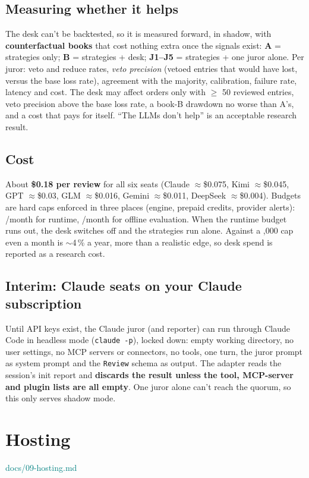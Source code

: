 \documentclass[11pt,a4paper]{article}
\newcommand\euro{\ifmmode\text{\texteuro}\else\texteuro\fi}
\newcommand\Section[1]{\Needspace{14\baselineskip}\section{#1}}
\newcommand\code[1]{\texttt{#1}}
\newcommand\doc[1]{\textsf{\footnotesize\textcolor{teal}{#1}}}
\begin{document}
\subsection{Measuring whether it helps}
The desk can't be backtested, so it is measured forward, in shadow, with \textbf{counterfactual books} that cost nothing extra
once the signals exist: \textbf{A} = strategies only; \textbf{B} = strategies + desk; \textbf{J1--J5} = strategies + one juror
alone. Per juror: veto and reduce rates, \emph{veto precision} (vetoed entries that would have lost, versus the base loss rate),
agreement with the majority, calibration, failure rate, latency and cost. The desk may affect orders only with $\ge$ 50 reviewed
entries, veto precision above the base loss rate, a book-B drawdown no worse than A's, and a cost that pays for itself.
``The LLMs don't help'' is an acceptable research result.

\subsection{Cost}
About \textbf{\$0.18 per review} for all six seats (Claude $\approx$\$0.075, Kimi $\approx$\$0.045, GPT $\approx$\$0.03, GLM
$\approx$\$0.016, Gemini $\approx$\$0.011, DeepSeek $\approx$\$0.004). Budgets are hard caps enforced in three places (engine,
prepaid credits, provider alerts): \euro10/month for runtime, \euro15/month for offline evaluation. When the runtime budget runs
out, the desk switches off and the strategies run alone. Against a \euro1,000 cap even \euro3 a month is $\sim$4\,\% a year, more
than a realistic edge, so desk spend is reported as a research cost.

\subsection{Interim: Claude seats on your Claude subscription}
Until API keys exist, the Claude juror (and reporter) can run through Claude Code in headless mode (\code{claude -p}), locked
down: empty working directory, no user settings, no MCP servers or connectors, no tools, one turn, the juror prompt as system
prompt and the \code{Review} schema as output. The adapter reads the session's init report and \textbf{discards the result unless
the tool, MCP-server and plugin lists are all empty}. One juror alone can't reach the quorum, so this only serves shadow mode.

\Section{Hosting}
\doc{docs/09-hosting.md}
\end{document}
